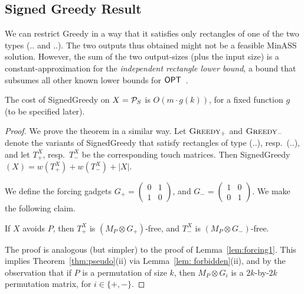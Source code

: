 \subsection{Signed Greedy Result}

We can restrict {\sc Greedy} in a way that it satisfies only rectangles of one of the two types (.. and ..). The two outputs thus obtained might not be a feasible {\sc MinASS} solution. However, the sum of the two output-sizes (plus the input size) is a constant-approximation for the \emph{independent rectangle lower bound}, a bound that subsumes all other known lower bounds for $\mbox{\sf OPT}$~\cite{DHIKP09, Harmon}. 

\begin{theorem} 
The cost of {\sc SignedGreedy} on $X = {\mathcal{P}}_S$ is $O(m \cdot g(k))$, for a fixed function $g$ (to be specified later).
\end{theorem} 
\begin{proof} 
We prove the theorem in a similar way. Let $\textsc{Greedy}_{+}$ and $\textsc{Greedy}_{-}$ denote the variants of {\sc SignedGreedy} that satisfy rectangles of type (..), resp.\ (..), and let $T^X_{+}$, resp.\ $T^X_{-}$ be the corresponding touch matrices. Then {\sc SignedGreedy}$(X) = w(T^X_{+}) + w(T^X_{-}) + |X|$.


We define the forcing gadgets $G_{+} = \left( \begin{matrix}
  0 & 1 \\
  1 & 0 
 \end{matrix}\right)$, and $G_{-} = \left( \begin{matrix}
  1 & 0 \\
  0 & 1 
 \end{matrix}\right)$. We make the following claim.
 \begin{lemma}
 \label{lem:forcing_signed}
 If $X$ avoids $P$, then $T^X_{+}$ is $(M_P \otimes G_{+})$-free, and $T^X_{-}$ is $(M_P \otimes G_{-})$-free.
 \end{lemma}
 
The proof is analogous (but simpler) to the proof of Lemma~\ref{lem:forcing1}. This implies Theorem~\ref{thm:pseudo}(ii) via Lemma~\ref{lem: forbidden}(ii), and by the observation that if $P$ is a permutation of size $k$, then $M_P \otimes G_i$ is a $2k$-by-$2k$ permutation matrix, for $i \in \{+,-\}$. 
\end{proof}  

